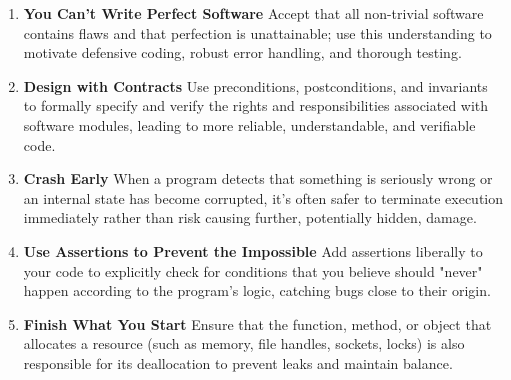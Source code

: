 \documentclass[11pt]{article}
\begin{document}
\begin{tcolorbox}[pragchapterbox={Chapter 4: Pragmatic Paranoia}]
\begin{multicols}{2}
\begin{enumerate}[label=\arabic*., start=29, itemsep=1ex, topsep=0pt, partopsep=0pt, labelwidth=!, labelindent=0pt, leftmargin=*]
    \item \textbf{You Can’t Write Perfect Software}
    Accept that all non-trivial software contains flaws and that perfection is unattainable; use this understanding to motivate defensive coding, robust error handling, and thorough testing.

    \item \textbf{Design with Contracts}
    Use preconditions, postconditions, and invariants to formally specify and verify the rights and responsibilities associated with software modules, leading to more reliable, understandable, and verifiable code.

    \item \textbf{Crash Early}
    When a program detects that something is seriously wrong or an internal state has become corrupted, it's often safer to terminate execution immediately rather than risk causing further, potentially hidden, damage.

    \item \textbf{Use Assertions to Prevent the Impossible}
    Add assertions liberally to your code to explicitly check for conditions that you believe should "never" happen according to the program's logic, catching bugs close to their origin.

    \item \textbf{Finish What You Start}
    Ensure that the function, method, or object that allocates a resource (such as memory, file handles, sockets, locks) is also responsible for its deallocation to prevent leaks and maintain balance.
\end{enumerate}
\end{multicols}
\end{tcolorbox}
\end{document}
